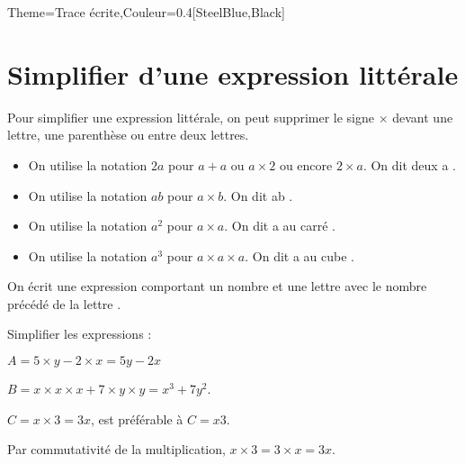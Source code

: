 \begin{Maquette}[Cours]{Theme={Trace écrite},Couleur={0.4[SteelBlue,Black]}}
   
   \section{Simplifier d'une expression littérale}
   
   Pour simplifier une expression littérale, on peut supprimer le signe \og $\times$ \fg{} devant une lettre, une parenthèse ou entre deux lettres. 
   
   \begin{propriete*}{}
      \begin{itemize}
         \item On utilise la notation $2a$ pour $a+a$ ou $a\times2$ ou encore $2\times a$. On dit \og deux a \fg.
         \item On utilise la notation $ab$ pour $a\times b$. On dit \og ab \fg.
         \item On utilise la notation $a^2$ pour $a\times a$. On dit \og a au carré \fg.
         \item On utilise la notation $a^3$ pour $a\times a\times a$. On dit \og a au cube \fg.
      \end{itemize}
   \end{propriete*}

   
   On écrit une expression comportant un nombre et une \og lettre \fg{} avec le nombre précédé de la \og lettre \fg.
   
   \begin{exemple*}{}
      Simplifier les expressions : \par
      $A =5\times y-2\times x =5y-2x$ \par
      $B =x\times x \times x + 7\times y\times y =x^3+7y^2$. \par
      $C =x\times3 =3x$, est préférable à $C=x3$. \par
         Par commutativité de la multiplication, $x\times3 =3\times x =3x$.
   \end{exemple*}

\end{Maquette}


